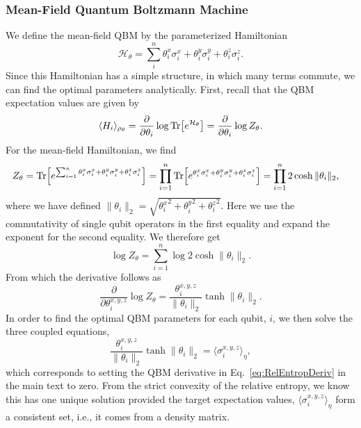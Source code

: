 \documentclass[
    aps,
    prx,
    onecolumn
]{revtex4-2}
\begin{document}
\subsubsection{Mean-Field Quantum Boltzmann Machine}
We define the mean-field QBM by the parameterized Hamiltonian 
 \begin{equation}
    \mathcal{H}_\theta = \sum_i^n \theta^x_i \sigma_i^x + \theta^y_i \sigma_i^y +  \theta^z_i \sigma_i^z.
\end{equation} Since this Hamiltonian has a simple structure, in which many terms commute, we can find the optimal parameters analytically. First, recall that the QBM expectation values are given by \begin{equation}
    \langle H_i\rangle_{\rho_\theta} = \frac{\partial}{\partial \theta_i} \log{\Tr[e^{\mathcal{H}_\theta}]} =  \frac{\partial}{\partial \theta_i}\log{Z_\theta}. 
\end{equation} 
For the mean-field Hamiltonian, we find 
\begin{align}
    Z_\theta &= \Tr[e^{\sum_{i=1}^n\theta^x_i \sigma_i^x + \theta^y_i \sigma_i^y +  \theta^z_i \sigma_i^z}]
    =\prod_{i=1}^n \Tr[ e^{\theta^x_i \sigma_i^x + \theta^y_i \sigma_i^y + \theta^z_i \sigma_i^z}]
    = \prod_{i=1}^n 2\cosh{\|\theta_i\|_2},
\end{align} 
where we have defined $\|\theta_i\|_2=\sqrt{ {\theta_i^x}^2 + {\theta_i^y}^2 +{\theta_i^z}^2}$. Here we use the commutativity of single qubit operators in the first equality and expand the exponent for the second equality.  We therefore get \begin{equation}
\log{Z_\theta} = \sum^n_{i=1} \log{2\cosh{ \| \theta_i \|_2}}. 
\end{equation} 
From which the derivative follows as 
\begin{equation}
    \frac{\partial}{\partial \theta_i^{x,y,z}} \log{Z_\theta}
    = \frac{\theta_i^{x,y,z}}{\|\theta_i\|_2} \tanh{\|\theta_i\|_2}. 
\end{equation} 
In order to find the optimal QBM parameters for each qubit, $i$, we then solve the three coupled equations,
\begin{equation}
\label{eq:MFcoupled}
    \frac{\theta_i^{x,y,z}}{\|\theta_i\|_2} \tanh{\|\theta_i\|_2} = \langle \sigma_i^{x,y,z}\rangle_\eta,
\end{equation} 
which corresponds to setting the QBM derivative in Eq.~\eqref{eq:RelEntropDeriv} in the main text to zero. From the strict convexity of the relative entropy, we know this has one unique solution provided the target expectation values, $\langle \sigma_i^{x,y,z}\rangle_\eta$ form a consistent set, i.e., it comes from a density matrix. 
\end{document}
